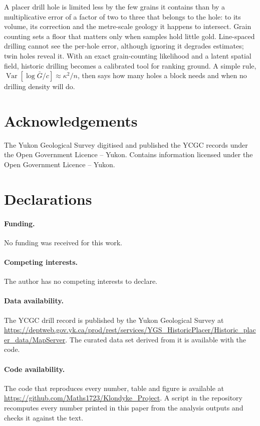\documentclass[11pt,a4paper]{article}
\theoremstyle{remark}
\newcommand{\Var}{\operatorname{Var}}
\begin{document}
A placer drill hole is limited less by the few grains it contains than by a multiplicative error of a factor of two to three that belongs to the hole: to its volume, its correction and the metre-scale geology it happens to intersect. Grain counting sets a floor that matters only when samples hold little gold. Line-spaced drilling cannot see the per-hole error, although ignoring it degrades estimates; twin holes reveal it. With an exact grain-counting likelihood and a latent spatial field, historic drilling becomes a calibrated tool for ranking ground. A simple rule, $\Var[\log \bar G/c] \approx \kappa^2/n$, then says how many holes a block needs and when no drilling density will do.

\section*{Acknowledgements}
The Yukon Geological Survey digitised and published the YCGC records under the Open Government Licence -- Yukon. Contains information licensed under the Open Government Licence -- Yukon.

\section*{Declarations}

\paragraph{Funding.} No funding was received for this work.

\paragraph{Competing interests.} The author has no competing interests to declare.

\paragraph{Data availability.} The YCGC drill record is published by the Yukon Geological Survey at \url{https://deptweb.gov.yk.ca/prod/rest/services/YGS_HistoricPlacer/Historic_placer_data/MapServer}. The curated data set derived from it is available with the code.

\paragraph{Code availability.} The code that reproduces every number, table and figure is available at \url{https://github.com/Maths1723/Klondyke_Project}. A script in the repository recomputes every number printed in this paper from the analysis outputs and checks it against the text.
\end{document}
